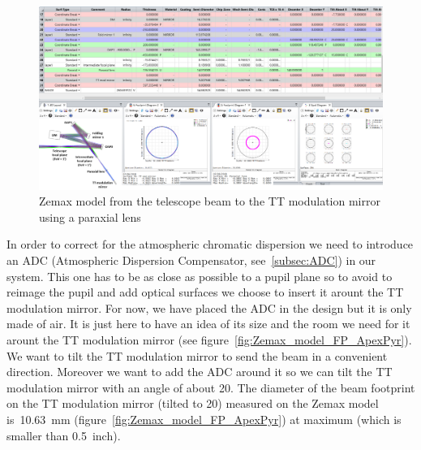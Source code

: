 \documentclass[12pt,a4paper]{article}
\begin{document}
\begin{figure}[H]
	\begin{center}
		\includegraphics[width=\textwidth]{images/Zemax_model_FP_TTmod_noTilt.PNG}
		\caption{Zemax model from the telescope beam to the TT modulation mirror using a paraxial lens}\label{fig:Zemax_model_FP_TTmod_noTilt}
	\end{center}
\end{figure}

In order to correct for the atmospheric chromatic dispersion we need to introduce an ADC (Atmospheric Dispersion Compensator, see~\ref{subsec:ADC}) in our system. This one has to be as close as possible to a pupil plane so to avoid to reimage the pupil and add optical surfaces we choose to insert it arount the TT modulation mirror. For now, we have placed the ADC in the design but it is only made of air. It is just here to have an idea of its size and the room we need for it arount the TT modulation mirror (see figure~\ref{fig:Zemax_model_FP_ApexPyr}).\\

We want to tilt the TT modulation mirror to send the beam in a convenient direction. Moreover we want to add the ADC around it so we can tilt the TT modulation mirror with an angle of about 20\degree. The diameter of the beam footprint on the TT modulation mirror (tilted to 20\degree) measured on the Zemax model is~10.63~mm (figure~\ref{fig:Zemax_model_FP_ApexPyr}) at maximum (which is smaller than 0.5~inch).\\
\end{document}
